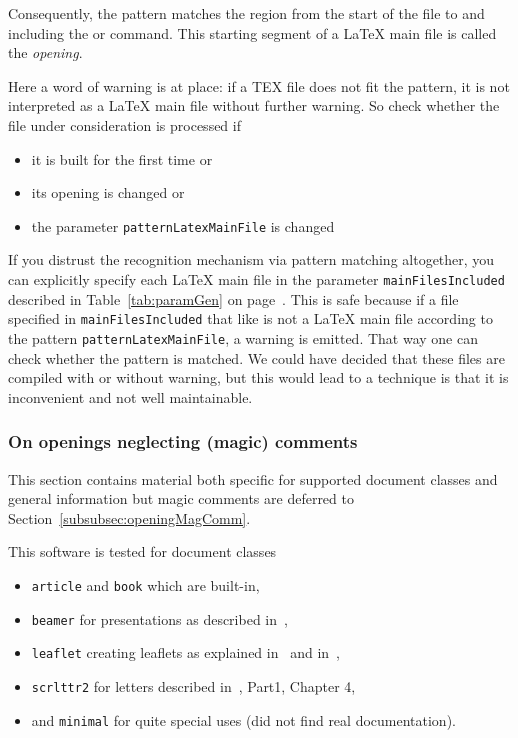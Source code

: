 Consequently, the pattern matches the region from the start of the file 
to and including the  or  command. 
This starting segment of a \LaTeX{} main file 
is called the \textit{opening}. 

Here a word of warning is at place: if a TEX file does not fit the pattern, 
it is not interpreted as a \LaTeX{} main file without further warning. 
So check whether the file under consideration is processed if 
%
\begin{itemize}
  \item 
  it is built for the first time or 
  \item 
  its opening  is changed or
  \item 
  the parameter \texttt{patternLatexMainFile} is changed 
\end{itemize}
%
If you distrust the recognition mechanism via pattern matching altogether, 
you can explicitly specify each \LaTeX{} main file 
in the parameter \texttt{mainFilesIncluded} 
described in Table~\ref{tab:paramGen} on page~\pageref{tab:paramGen}. 
This is safe because if a file specified in \texttt{mainFilesIncluded} 
that like is not a \LaTeX{} main file according to the pattern \texttt{patternLatexMainFile}, 
a warning is emitted. 
That way one can check whether the pattern is matched. 
We could have decided that these files are compiled with or without warning, 
but this would lead to a technique is that it is inconvenient and not well maintainable. 


\subsubsection{On openings neglecting (magic) comments}\label{subsubsec:openingNoMagComm}

This section contains material both specific for supported document classes 
and general information but magic comments are deferred to Section~\ref{subsubsec:openingMagComm}. 

This software is tested for document classes 
%
\begin{itemize}
  \item \texttt{article} and \texttt{book} which are built-in, 
  \item \texttt{beamer} for presentations as described in~\cite{Beamer}, 
  \item \texttt{leaflet} creating leaflets as explained in~\cite{Leaflet} and in~\cite{LeafletMan}, 
  \item \texttt{scrlttr2} for letters described in~\cite{KomaAnl23}, Part1, Chapter 4, 
  \item and \texttt{minimal} for quite special uses (did not find real documentation). 
\end{itemize}


